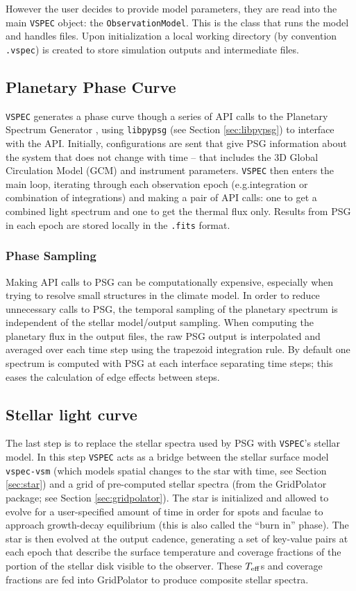 \documentclass[twocolumn,linenumbers]{aastex631}
\newcommand{\teff}{$T_{\rm eff}$}
\newcommand{\vspec}[1]{\texttt{VSPEC}#1}
\begin{document}
However the user decides to provide model parameters, they are read into the main \vspec{} object: the \texttt{ObservationModel}.
This is the class that runs the model and handles files. Upon initialization a local working directory
(by convention \texttt{.vspec}) is created to store simulation outputs and intermediate files.

\subsection{Planetary Phase Curve}
\label{subsec:phase-curve}
\vspec{} generates a phase curve though a series of API calls to the Planetary Spectrum Generator \citep[PSG][]{villanueva2018}, using
\texttt{libpypsg} (see Section \ref{sec:libpypsg}) to interface with the API. Initially, configurations are sent that give PSG information about
the system that does not change with time -- that includes the 3D Global Circulation Model (GCM) and instrument parameters. \vspec{} then enters
the main loop, iterating through each observation epoch (e.g.integration or combination of integrations) and making a pair of API calls: one to get a combined light spectrum and one to get the thermal flux only.
Results from PSG in each epoch are stored locally in the \texttt{.fits} format. 

\subsubsection{Phase Sampling}
Making API calls to PSG can be computationally expensive, especially when trying to resolve small structures in the climate model. In order to reduce unnecessary calls to PSG, the temporal sampling of the planetary spectrum is independent of the stellar model/output sampling. When computing the planetary flux in the output files, the raw PSG output is interpolated and averaged over each time step using the trapezoid integration rule. By default one spectrum is computed with PSG at each interface separating time steps; this eases the calculation of edge effects between steps.

\subsection{Stellar light curve}

The last step is to replace the stellar spectra used by PSG with \vspec{}'s stellar model. In this step \vspec{} acts as a bridge between
the stellar surface model \texttt{vspec-vsm} (which models spatial changes to the star with time, see Section \ref{sec:star}) and a grid of
pre-computed stellar spectra (from the GridPolator package; see Section \ref{sec:gridpolator}). The star is initialized and allowed to evolve for a user-specified amount of time in order for spots and faculae to approach growth-decay equilibrium (this is also called the ``burn in'' phase). The star is then evolved at the output cadence, generating a set of key-value pairs at each epoch that describe the surface temperature and coverage fractions of the portion of the stellar disk visible to the observer. These \teff s and coverage fractions are fed into GridPolator to produce composite stellar spectra.
\end{document}
